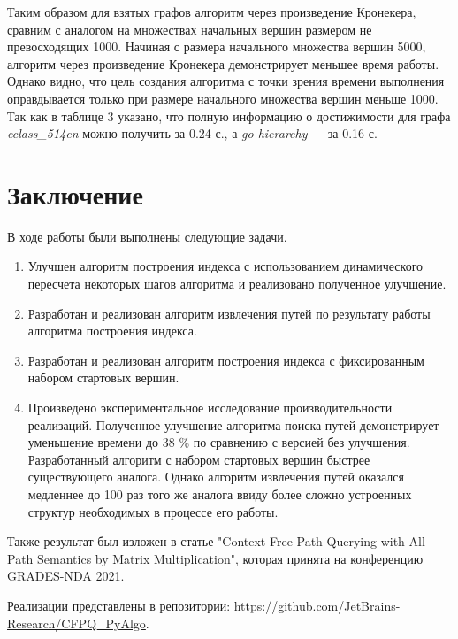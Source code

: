 Таким образом для взятых графов алгоритм через произведение Кронекера, сравним с аналогом на множествах начальных вершин размером не превосходящих 1000. Начиная с размера начального множества вершин 5000, алгоритм через произведение Кронекера демонстрирует меньшее время работы. Однако видно, что цель создания алгоритма с точки зрения времени выполнения оправдывается только при размере начального множества вершин меньше 1000. Так как в таблице 3 указано, что полную информацию о достижимости для графа \textit{eclass\_514en} можно получить за 0.24 с., а \textit{go-hierarchy} --- за 0.16 с.



\section*{Заключение}
В ходе работы были выполнены следующие задачи.
\begin{enumerate}
    \item Улучшен алгоритм построения индекса с использованием динамического пересчета некоторых шагов алгоритма и реализовано полученное улучшение.
    \item Разработан и реализован алгоритм извлечения путей по результату работы алгоритма построения индекса.
    \item Разработан и реализован алгоритм построения индекса с фиксированным набором стартовых вершин.
    \item Произведено экспериментальное исследование производительности реализаций. Полученное улучшение алгоритма поиска путей демонстрирует уменьшение времени до 38 \% по сравнению с версией без улучшения. Разработанный алгоритм с набором стартовых вершин быстрее существующего аналога. Однако алгоритм извлечения путей оказался медленнее до 100 раз того же аналога ввиду более сложно устроенных структур необходимых в процессе его работы.
\end{enumerate}

Также результат был изложен в статье "Context-Free Path Querying with All-Path Semantics by Matrix Multiplication", которая принята на конференцию GRADES-NDA 2021.

Реализации представлены в репозитории: \href{https://github.com/JetBrains-Research/CFPQ\_PyAlgo}{https://github.com/JetBrains-Research/CFPQ\_PyAlgo}.

\setmonofont[Mapping=tex-text]{CMU Typewriter Text}



